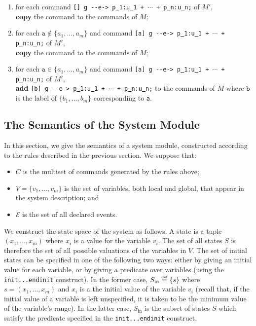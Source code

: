 \documentclass{article}
\newcommand{\eqdef}{\ensuremath{\stackrel{\text{\tiny def}}{=}}}
\newcommand{\arci}[1]{{-}{-}{#1}->}
\newcommand{\calE}{\mathcal{E}}
\renewcommand{\_}{\underline{~}}
\newcommand{\events}{{\calE}}
\newcommand{\initstates}{S_\mathrm{in}}
\newcommand{\code}[1]{\texttt{#1}}
\begin{document}
\begin{enumerate}
	
    \item for each command \code{[] g \arci{e} p\_1:u\_1 + $\cdots$ + p\_n:u\_n;} of $M'$, \\ 
    \textbf{copy} the command to the commands of $M$;

    \item for each $\code{a} \not\in \{a_1,\ldots,a_m\}$ and command \code{[a] g \arci{e}  p\_1:u\_1 + $\cdots$ + p\_n:u\_n;} of $M'$, \\ 
    \textbf{copy} the command to the commands of $M$;

    \item for each $\code{a} \in \{a_1,\ldots,a_m\}$ and command \code{[a] g \arci{e}  p\_1:u\_1 + $\cdots$ + p\_n:u\_n;} of $M'$, \\
    \textbf{add} \code{[b] g \arci{e}  p\_1:u\_1 + $\cdots$ + p\_n:u\_n;} to the commands of $M$ where $\code{b}$ is the label of $\{b_1,\ldots,b_m\}$ corresponding to \code{a}.

\end{enumerate}%

\subsection*{The Semantics of the System Module}
In this section, we give the semantics of a system module, constructed according to the rules described in the previous section.
We suppose that:
\begin{itemize}
	\item $C$ is the multiset of commands generated by the rules above;
	\item $V = \{v_1, \ldots , v_m\}$ is the set of variables, both local and global, that appear in the system description; and
	\item $\events$ is the set of all declared events.
\end{itemize}

We construct the state space of the system as follows. 
A state is a tuple $(x_1, \ldots , x_m)$ where $x_i$ is a value for the variable $v_i$. 
The set of all states $S$ is therefore the set of all possible valuations of the variables in $V$. 
The set of initial states can be specified in one of the following two ways: either by giving an initial value for each variable, or by giving a predicate over variables (using the \code{init...endinit} construct). 
In the former case, $\initstates \eqdef \{s\}$ where $s = (x_1, \ldots , x_m)$ and $x_i$ is a the initial value of the variable $v_i$ (recall that, if the initial value of a variable is left unspecified, it is taken to be the minimum value of the variable’s range). 
In the latter case, $\initstates$ is the subset of states $S$ which satisfy the
predicate specified in the \code{init...endinit} construct.
\end{document}
